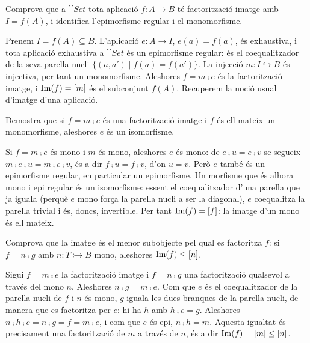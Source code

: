 \begin{exercici}
Comprova que a $\cat{Set}$ tota aplicació $f\colon A\to B$ té factorització imatge amb $I=f(A)$, i identifica l'epimorfisme regular i el monomorfisme.
\end{exercici}

\begin{solucio}
Prenem $I=f(A)\subseteq B$. L'aplicació $e\colon A\to I$, $e(a)=f(a)$, és exhaustiva, i tota aplicació exhaustiva a $\cat{Set}$ és un epimorfisme regular: és el coequalitzador de la seva parella nucli $\{(a,a')\mid f(a)=f(a')\}$. La injecció $m\colon I\hookrightarrow B$ és injectiva, per tant un monomorfisme. Aleshores $f=m\comp e$ és la factorització imatge, i $\operatorname{Im}(f)=[m]$ és el subconjunt $f(A)$. Recuperem la noció usual d'imatge d'una aplicació.
\end{solucio}

\begin{exercici}
Demostra que si $f=m\comp e$ és una factorització imatge i $f$ és ell mateix un monomorfisme, aleshores $e$ és un isomorfisme.
\end{exercici}

\begin{solucio}
Si $f=m\comp e$ és mono i $m$ és mono, aleshores $e$ és mono: de $e\comp u=e\comp v$ se segueix $m\comp e\comp u=m\comp e\comp v$, és a dir $f\comp u=f\comp v$, d'on $u=v$. Però $e$ també és un epimorfisme regular, en particular un epimorfisme. Un morfisme que és alhora mono i epi regular és un isomorfisme: essent el coequalitzador d'una parella que ja iguala (perquè $e$ mono força la parella nucli a ser la diagonal), $e$ coequalitza la parella trivial i és, doncs, invertible. Per tant $\operatorname{Im}(f)=[f]$: la imatge d'un mono és ell mateix.
\end{solucio}

\begin{exercici}
Comprova que la imatge és el menor subobjecte pel qual es factoritza $f$: si $f=n\comp g$ amb $n\colon T\rightarrowtail B$ mono, aleshores $\operatorname{Im}(f)\leq[n]$.
\end{exercici}

\begin{solucio}
Sigui $f=m\comp e$ la factorització imatge i $f=n\comp g$ una factorització qualsevol a través del mono $n$. Aleshores $n\comp g=m\comp e$. Com que $e$ és el coequalitzador de la parella nucli de $f$ i $n$ és mono, $g$ iguala les dues branques de la parella nucli, de manera que es factoritza per $e$: hi ha $h$ amb $h\comp e=g$. Aleshores $n\comp h\comp e=n\comp g=f=m\comp e$, i com que $e$ és epi, $n\comp h=m$. Aquesta igualtat és precisament una factorització de $m$ a través de $n$, és a dir $\operatorname{Im}(f)=[m]\leq[n]$.
\end{solucio}

